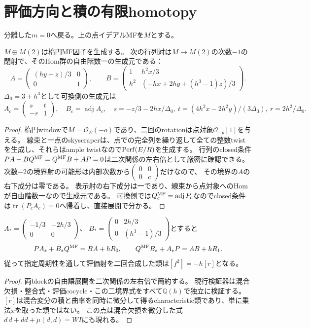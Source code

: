 \section{評価方向と積の有限homotopy}
分離した$m=0$へ戻る。上の点イデアルMFを$M$とする。
\begin{proposition}
$M\oplus M(2)$は楕円MF因子を生成する。
次の行列対は$M\to M(2)$の次数$-1$の閉射で、そのHom群の自由階数一の生成元である：
\[
 A=\begin{pmatrix}(hy-z)/3&0\\0&1\end{pmatrix},\qquad
 B=\begin{pmatrix}1&h^2x/3\\h^2&(-hx+2hy+(h^3-1)z)/3\end{pmatrix}.
\]
$\Delta_0=3+h^3$として可換側の生成元は
\[
 A_c=\begin{pmatrix}s&t\\-r&1\end{pmatrix},\quad B_c=\operatorname{adj}A_c,
 \quad s=-z/3-2hx/\Delta_0,\ t=(4h^2x-2h^2y)/(3\Delta_0),\ r=2h^2/\Delta_0.
\]
\end{proposition}
\begin{proof}
楕円windowで$M=\mathcal O_E(-o)$であり、二回のrotationは点対象$\mathcal O_{-p}[1]$を与える。
線束と一点のskyscraperは、点での完全列を繰り返して全ての整数twistを生成し、それらはample twistなので$\operatorname{Perf}(E/R)$を生成する。
行列のclosed条件$PA+BQ^{\rm MF}=Q^{\rm MF}B+AP=0$は二次関係の左右倍として厳密に確認できる。
次数$-2$の境界射の可能形は内部次数から$\left(\begin{smallmatrix}0&0\\0&c\end{smallmatrix}\right)$だけなので、
その境界の$A$の右下成分は零である。
表示射の右下成分は一であり、線束から点対象へのHomが自由階数一なので生成元である。
可換側では$Q_c^{\rm MF}=\operatorname{adj}P_c$なのでclosed条件は$\operatorname{tr}(P_cA_c)=0$へ帰着し、直接展開で分かる。
\end{proof}

\begin{proposition}\label{mix:product}
$A_* =\left(\begin{smallmatrix}-1/3&-2h/3\\0&0\end{smallmatrix}\right)$、
$B_* =\left(\begin{smallmatrix}0&2h/3\\0&(h^3-1)/3\end{smallmatrix}\right)$とすると
\[
 PA_*+B_*Q^{\rm MF}=BA+hR_0,\qquad
 Q^{\rm MF}B_*+A_*P=AB+hR_1.
\]
従って指定周期性を通して評価射を二回合成した類は$[f^2]=-h[r]$となる。
\end{proposition}
\begin{proof}
両blockの自由語展開を二次関係の左右倍で簡約する。
現行検証器は混合欠損・整合式・評価cocycle・この二境界式をすべて$\mathbb Q(h)$で独立に検証する。
$[r]$は混合変分の積と曲率を同時に微分して得るcharacteristic類であり、単に乗法$x$を取った類ではない。
この点は混合欠損を微分した式$\dot d\,d+d\dot d+\dot\mu(d,d)=\dot W I$にも現れる。
\end{proof}
